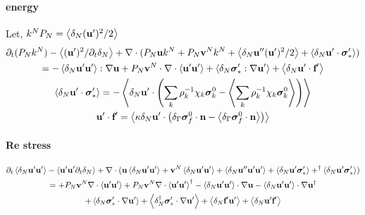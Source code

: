 \paragraph{energy}
Let, $k^N P_N = \left<\delta_N (\textbf{u}')^2 /2\right>$ 
\begin{multline*}
    \partial_t (P_N k^N)
    - \left<(\textbf{u}')^2/\partial_t \delta_N \right>
    + \mathbf{\nabla}\cdot ( P_N \textbf{u} k^N 
    +  P_N \textbf{v}^N  k^N 
    + \left<\delta_N \textbf{u}'' (\textbf{u}')^2/2\right>
    + \left<\delta_N \textbf{u}'\cdot \bm\sigma_*'\right>)\\
    =
    - \left<\delta_N \textbf{u}'\textbf{u}'\right> : \mathbf{\nabla} \textbf{u}
    + P_N \textbf{v}^N \cdot \mathbf{\nabla}\cdot \left<\textbf{u}'\textbf{u}'\right>
    + \left<\delta_N \bm\sigma_*':\mathbf{\nabla} \textbf{u}'\right> 
    + \left<\delta_N  \textbf{u}'\cdot \textbf{f}'\right> \\    
    \left<\delta_N \textbf{u}'\cdot \bm\sigma_*'\right>
    =
    - \left<\delta_N \textbf{u}'\cdot 
    \left(\sum_k \rho^{-1}_k \chi_k \bm\sigma_k^0
    - \left<\sum_k \rho^{-1}_k \chi_k \bm\sigma_k^0  \right>
    \right)
    \right>
    \\
    \textbf{u}'\cdot \textbf{f}'
    =
    \left<\kappa \delta_N   \textbf{u}' \cdot \left(\delta_{\Gamma}  \bm\sigma_f^0 \cdot \textbf{n}
    - \left<\delta_{\Gamma}  \bm\sigma_f^0 \cdot \textbf{n}\right>\right)\right>
    \\
\end{multline*}
\paragraph{Re stress }
\begin{multline}
    \partial_t \left<\delta_N \textbf{u}'\textbf{u}'\right>
    - \left<\textbf{u}'\textbf{u}' \partial_t \delta_N \right>
    + \mathbf{\nabla}\cdot (
         \textbf{u} \left<\delta_N \textbf{u}'\textbf{u}'\right>
         +  \textbf{v}^N \left<\delta_N \textbf{u}'\textbf{u}'\right>
         + \left<\delta_N \textbf{u}'' \textbf{u}'\textbf{u}'\right>
        + \left<\delta_N \textbf{u}'\bm\sigma_*'\right>
        + ^\dagger \left<\delta_N \textbf{u}'\bm\sigma_*'\right>
         )
         \\
         = 
         +P_N \textbf{v}^N\mathbf{\nabla}\cdot \left<\textbf{u}'\textbf{u}'\right>
         +P_N \textbf{v}^N\mathbf{\nabla}\cdot \left<\textbf{u}'\textbf{u}'\right>^\dagger
         - \left<\delta_N \textbf{u}' \textbf{u}'\right>\cdot \mathbf{\nabla}\textbf{u}
         - \left<\delta_N \textbf{u}' \textbf{u}'\right>\cdot \mathbf{\nabla}\textbf{u}^\dagger\\
    + \left<\delta_N \bm\sigma_*'\cdot \mathbf{\nabla} \textbf{u}'\right>
    + \left<\delta_N ^\dagger \bm\sigma_*'\cdot \mathbf{\nabla} \textbf{u}'\right>
    + \left<\delta_N \textbf{f}'\textbf{u}'\right>
    + \left<\delta_N \textbf{u}'\textbf{f}'\right>
\end{multline}

